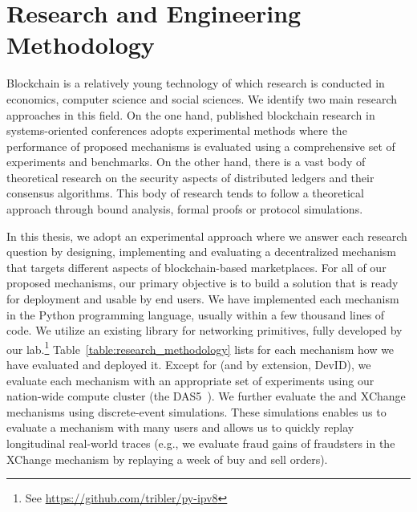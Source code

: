 \section{Research and Engineering Methodology}
Blockchain is a relatively young technology of which research is conducted in economics, computer science and social sciences.
We identify two main research approaches in this field.
On the one hand, published blockchain research in systems-oriented conferences adopts experimental methods where the performance of proposed mechanisms is evaluated using a comprehensive set of experiments and benchmarks.
On the other hand, there is a vast body of theoretical research on the security aspects of distributed ledgers and their consensus algorithms.
This body of research tends to follow a theoretical approach through bound analysis, formal proofs or protocol simulations.

In this thesis, we adopt an experimental approach where we answer each research question by designing, implementing and evaluating a decentralized mechanism that targets different aspects of blockchain-based marketplaces.
For all of our proposed mechanisms, our primary objective is to build a solution that is ready for deployment and usable by end users.
We have implemented each mechanism in the Python programming language, usually within a few thousand lines of code.
We utilize an existing library for networking primitives, fully developed by our lab.\footnote{See \url{https://github.com/tribler/py-ipv8}}
Table~\ref{table:research_methodology} lists for each mechanism how we have evaluated and deployed it.
Except for \Dappcoder{} (and by extension, DevID), we evaluate each mechanism with an appropriate set of experiments using our nation-wide compute cluster (the DAS5~\cite{bal2016medium}).
We further evaluate the \TrustChain{} and XChange mechanisms using discrete-event simulations.
These simulations enables us to evaluate a mechanism with many users and allows us to quickly replay longitudinal real-world traces (e.g., we evaluate fraud gains of fraudsters in the XChange mechanism by replaying a week of buy and sell orders).

